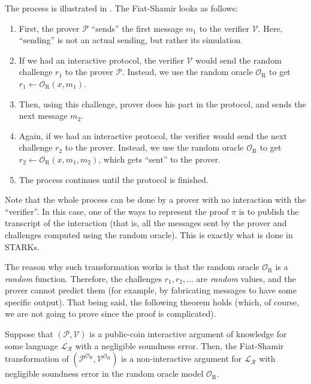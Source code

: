 \documentclass[../lecture-notes.tex]{subfiles}
\begin{document}
The process is illustrated in . The Fiat-Shamir looks as follows:
\begin{enumerate}
    \item First, the prover $\mathcal{P}$ ``sends'' the first message $m_1$ to the verifier $\mathcal{V}$. Here, ``sending'' is not an actual sending, but rather its simulation.
    \item If we had an interactive protocol, the verifier $\mathcal{V}$ would send the random challenge $r_1$ to the prover $\mathcal{P}$. Instead, we use the random oracle $\mathcal{O}_{\text{R}}$ to get $r_1 \gets \mathcal{O}_{\text{R}}(x,m_1)$.
    \item Then, using this challenge, prover does his part in the protocol, and sends the next message $m_2$. 
    \item Again, if we had an interactive protocol, the verifier would send the next challenge $r_2$ to the prover. Instead, we use the random oracle $\mathcal{O}_{\text{R}}$ to get $r_2 \gets \mathcal{O}_{\text{R}}(x,m_1,m_2)$, which gets ``sent'' to the prover.
    \item The process continues until the protocol is finished.
\end{enumerate}

Note that the whole process can be done by a prover with no interaction with the ``verifier''. In this case, one of the ways to represent the proof $\pi$ is to publish the transcript of the interaction (that is, all the messages sent by the prover and challenges computed using the random oracle). This is exactly what is done in STARKs.

The reason why such transformation works is that the random oracle $\mathcal{O}_{\text{R}}$ is a \textit{random} function. Therefore, the challenges $r_1,r_2,\dots$ are \textit{random} values, and the prover cannot predict them (for example, by fabricating messages to have some specific output). That being said, the following theorem holds (which, of course, we are not going to prove since the proof is complicated).

\begin{theorem}
    Suppose that $(\mathcal{P},\mathcal{V})$ is a public-coin interactive argument of knowledge for some language $\mathcal{L}_{\mathcal{R}}$ with a negligible soundness error. Then, the Fiat-Shamir transformation of $(\mathcal{P}^{\mathcal{O}_{\text{R}}},\mathcal{V}^{\mathcal{O}_{\text{R}}})$ is a non-interactive argument for $\mathcal{L}_{\mathcal{R}}$ with negligible soundness error in the random oracle model $\mathcal{O}_{\text{R}}$.
\end{theorem}
\end{document}
